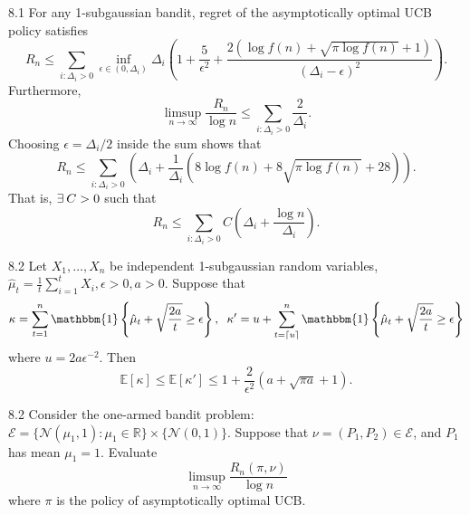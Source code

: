 \documentclass[10pt]{article}
\newenvironment{theorem*}[1]{%
  \IfBlankTF{#1}
    {\renewcommand{\themanualtheoreminner}{\unskip}}
    {\renewcommand\themanualtheoreminner{#1}}%
  \manualtheoreminner
}{\endmanualtheoreminner}
\newenvironment{lemma*}[1]{%
  \IfBlankTF{#1}
    {\renewcommand{\themanuallemmainner}{\unskip}}
    {\renewcommand\themanuallemmainner{#1}}%
  \manuallemmainner
}{\endmanuallemmainner}
\theoremstyle{definition}
\newenvironment{exercise*}[1]{%
  \IfBlankTF{#1}
    {\renewcommand{\themanualexerciseinner}{\unskip}}
    {\renewcommand\themanualexerciseinner{#1}}%
  \manualexerciseinner
}{\endmanualexerciseinner}
\DeclarePairedDelimiter{\ceil}{\lceil}{\rceil}
\begin{document}
\begin{theorem*}{8.1}
    For any 1-subgaussian bandit, regret of the asymptotically optimal UCB policy satisfies
    \begin{equation*}
        R_n \leq \sum_{i: \Delta_i > 0} \inf_{\epsilon \in (0, \Delta_i)} \Delta_i \left( 1 + \frac{5}{\epsilon^2} + \frac{2 \left(\log f(n) + \sqrt{\pi \log f(n)} + 1 \right)}{(\Delta_i - \epsilon)^2} \right).
    \end{equation*}
    Furthermore,
    \begin{equation*}
        \limsup_{n \to \infty} \frac{R_n}{\log n} \leq \sum_{i: \Delta_i > 0} \frac{2}{\Delta_i}.
    \end{equation*}
    Choosing $\epsilon = \Delta_i / 2$ inside the sum shows that
    \begin{equation*}
        R_n \leq \sum_{i : \Delta_i > 0} \left( \Delta_i + \frac{1}{\Delta_i} \left(8 \log f(n) + 8 \sqrt{\pi \log f(n)} + 28 \right) \right).
    \end{equation*}
    That is, $\exists \hspace{0.2em} C > 0$ such that
    \begin{equation*}
        R_n \leq \sum_{i : \Delta_i > 0} C \left( \Delta_i + \frac{\log n}{\Delta_i} \right).
    \end{equation*}
\end{theorem*}

\begin{lemma*}{8.2}
    Let $X_1, \ldots, X_n$ be independent 1-subgaussian random variables, $\hat{\mu}_t = \frac{1}{t} \sum_{i=1}^t X_i, \epsilon >0, a> 0$.
    Suppose that
    \begin{equation*}
        \kappa = \sum_{t=1}^n \mathbbm{1}\left\{\hat{\mu}_t + \sqrt{\frac{2a}{t}} \geq \epsilon \right\}, \hspace{0.2cm} \kappa' = u + \sum_{t=\ceil{u}}^n \mathbbm{1}\left\{\hat{\mu}_t + \sqrt{\frac{2a}{t}} \geq \epsilon \right\}
    \end{equation*}
    where $u = 2a\epsilon^{-2}$.
    Then
    \begin{equation*}
        \mathbb{E}[\kappa] \leq \mathbb{E}[\kappa'] \leq 1 + \frac{2}{\epsilon^2}(a + \sqrt{\pi a} + 1).
    \end{equation*}
\end{lemma*}

\begin{exercise*}{8.2}
    Consider the one-armed bandit problem: $\mathcal{E} = \{ \mathcal{N}(\mu_1, 1): \mu_1 \in \mathbb{R} \} \times \{ \mathcal{N}(0,1) \}$.
    Suppose that $\nu = (P_1, P_2) \in \mathcal{E}$, and $P_1$ has mean $\mu_1 = 1$.
    Evaluate
    \begin{equation*}
        \limsup_{n \to \infty} \frac{R_n(\pi, \nu)}{\log n}
    \end{equation*}
    where $\pi$ is the policy of asymptotically optimal UCB.
\end{exercise*}
\end{document}
